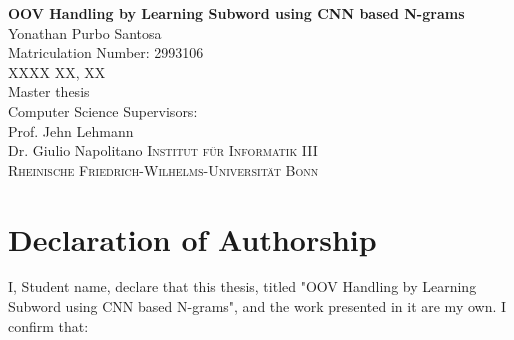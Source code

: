 \documentclass[a4paper,12pt]{report}
\begin{document}




\thispagestyle{empty}
\vskip40mm
\begin{center}
\huge\textbf{OOV Handling by Learning Subword using CNN based N-grams}\\
\vskip 1.5cm
\large Yonathan Purbo Santosa\\
Matriculation Number: 2993106\\
XXXX XX, XX\\
\vskip 1.5cm
Master thesis\\
Computer Science
\vskip 1.5cm
Supervisors:\\
Prof. Jehn Lehmann\\
Dr. Giulio Napolitano
\vfill
\textsc{Institut f{\"u}r Informatik III}\\
\textsc{Rheinische Friedrich-Wilhelms-Universit{\"a}t Bonn}
\end{center}

\newpage
\thispagestyle{empty}
\mbox{}

\chapter*{Declaration of Authorship}
I, Student name, declare that this thesis, titled "OOV Handling by
Learning Subword using CNN based N-grams", and the work presented in
it are my own. I confirm that:
\end{document}
